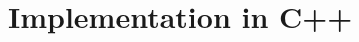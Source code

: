 \begin{comment}
The kinetic part $\opT$ and the quadratic part of the potential $\opU$ can be integrated exactly (see \cite{FGL_semiclassical_dynamics}).


The search for accurate time propagation schemes has become an area of research by itself, see papers of A and B

General notes about Operator Splitting?

Notation and Conventions
%
In this short section, some 
Consistent with previous work on libwaveblocks and existing code
$N$ number of levels
$D$ dimension
$M$ number of timesteps steps

TODO: check: are q and p vectors? $\bm{q,p}$ \\
$q^n, p^n \in V_N, \; Q^n, P^n \in M_{N \times N}, \; S^n \in \mathbb{R}, \bm{c}^n \in (c_k^n)_{k \in \K}$

TODO: hom/inhom for all algorithms!!!

\end{comment}












\clearpage
\section{Implementation in C++}

\begin{comment}
\cite{libwaveblocks}
What was the main challenge? What was controllable (which code could be changed), what not? 
Quick alternating o

The challenges were twofold: 
First, identifying of all the common basic building blocks and expressing all algorithms in terms of these components
Second, implementing all basic building blocks in a generic but efficient manner
Third, minimize the overhead for switching between function calls

 - encapsulate the functionality in a clean interface without loosing flexibility and 
 - write efficient/fast code

Tell how each of these challenges were overcome


Motivation of software design choices

	- Why class structure/inheritance (explain hierarchy)
	- CRTP / static polymorphism \cite{C_CRTP}
	- recognizing IP
	- callback function
	- implementation of IntSplit (TU,UT, partial specialization)
	- polymorphism through enable-if




\clearpage
\end{comment}
